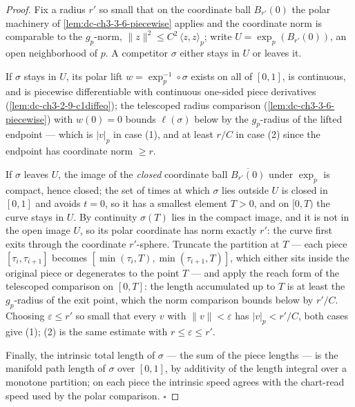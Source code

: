 \begin{proof}
  \leanok
  Fix a radius $r'$ so small that on the coordinate ball $B_{r'}(0)$ the
  polar machinery of \cref{lem:dc-ch3-3-6-piecewise} applies and the
  coordinate norm is comparable to the $g_p$-norm, $\|z\|^2\le C^2\,
  \langle z,z\rangle_p$; write $U=\exp_p(B_{r'}(0))$, an open neighborhood of
  $p$. A competitor $\sigma$ either stays in $U$ or leaves it.

  If $\sigma$ stays in $U$, its polar lift $w=\exp_p^{-1}\circ\sigma$ exists
  on all of $[0,1]$, is continuous, and is piecewise differentiable with
  continuous one-sided piece derivatives (\cref{lem:dc-ch3-2-9-c1diffeo});
  the telescoped radius comparison (\cref{lem:dc-ch3-3-6-piecewise}) with
  $w(0)=0$ bounds $\ell(\sigma)$ below by the $g_p$-radius of the lifted
  endpoint — which is $|v|_p$ in case (1), and at least $r/C$ in case (2)
  since the endpoint has coordinate norm $\ge r$.

  If $\sigma$ leaves $U$, the image of the \emph{closed} coordinate ball
  $\overline{B_{r'}(0)}$ under $\exp_p$ is compact, hence closed; the set of
  times at which $\sigma$ lies outside $U$ is closed in $[0,1]$ and avoids
  $t=0$, so it has a smallest element $T>0$, and on $[0,T)$ the curve stays
  in $U$. By continuity $\sigma(T)$ lies in the compact image, and it is not
  in the open image $U$, so its polar coordinate has norm exactly $r'$: the
  curve first exits through the coordinate $r'$-sphere. Truncate the
  partition at $T$ — each piece $[\tau_i,\tau_{i+1}]$ becomes
  $[\min(\tau_i,T),\min(\tau_{i+1},T)]$, which either sits inside the
  original piece or degenerates to the point $T$ — and apply the reach form
  of the telescoped comparison on $[0,T]$: the length accumulated up to $T$
  is at least the $g_p$-radius of the exit point, which the norm comparison
  bounds below by $r'/C$. Choosing $\varepsilon\le r'$ so small that every
  $v$ with $\|v\|<\varepsilon$ has $|v|_p<r'/C$, both cases give (1); (2) is
  the same estimate with $r\le\varepsilon\le r'$.

  Finally, the intrinsic total length of $\sigma$ — the sum of the piece
  lengths — is the manifold path length of $\sigma$ over $[0,1]$, by
  additivity of the length integral over a monotone partition; on each piece
  the intrinsic speed agrees with the chart-read speed used by the polar
  comparison. $\square$
\end{proof}


